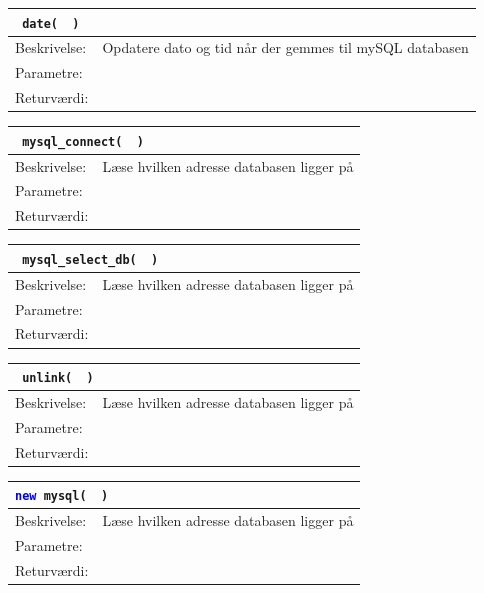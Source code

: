 \begin{table}[H]
\begin{tabular}{l p{12.5cm}}
\multicolumn{2}{l}{\texttt{\textcolor{blue}{} date( \textcolor{blue}{} )}} \\
\hline
Beskrivelse:&Opdatere dato og tid når der gemmes til mySQL databasen\\
Parametre:&\\
Returværdi:&\\
\end{tabular}
\end{table}

\begin{table}[H]
\begin{tabular}{l p{12.5cm}}
\multicolumn{2}{l}{\texttt{\textcolor{blue}{} mysql\_connect( \textcolor{blue}{} )}} \\
\hline
Beskrivelse:&Læse hvilken adresse databasen ligger på\\
Parametre:&\\
Returværdi:&\\
\end{tabular}
\end{table}

\begin{table}[H]
\begin{tabular}{l p{12.5cm}}
\multicolumn{2}{l}{\texttt{\textcolor{blue}{} mysql\_select\_db( \textcolor{blue}{} )}} \\
\hline
Beskrivelse:&Læse hvilken adresse databasen ligger på\\
Parametre:&\\
Returværdi:&\\
\end{tabular}
\end{table}

\begin{table}[H]
\begin{tabular}{l p{12.5cm}}
\multicolumn{2}{l}{\texttt{\textcolor{blue}{} unlink( \textcolor{blue}{} )}} \\
\hline
Beskrivelse:&Læse hvilken adresse databasen ligger på\\
Parametre:&\\
Returværdi:&\\
\end{tabular}
\end{table}

\begin{table}[H]
\begin{tabular}{l p{12.5cm}}
\multicolumn{2}{l}{\texttt{\textcolor{blue}{new} mysql( \textcolor{blue}{} )}} \\
\hline
Beskrivelse:&Læse hvilken adresse databasen ligger på\\
Parametre:&\\
Returværdi:&\\
\end{tabular}
\end{table}

